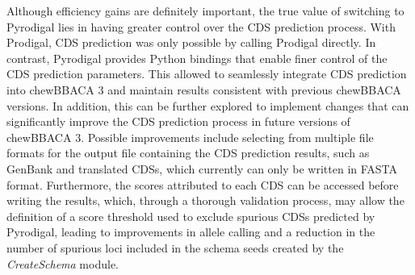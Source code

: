 Although efficiency gains are definitely important, the true value of switching to Pyrodigal lies in having greater control over the \ac{CDS} prediction process. With Prodigal, \ac{CDS} prediction was only possible by calling Prodigal directly. In contrast, Pyrodigal provides Python bindings that enable finer control of the \ac{CDS} prediction parameters. This allowed to seamlessly integrate \ac{CDS} prediction into chewBBACA 3 and maintain results consistent with previous chewBBACA versions. In addition, this can be further explored to implement changes that can significantly improve the \ac{CDS} prediction process in future versions of chewBBACA 3. Possible improvements include selecting from multiple file formats for the output file containing the \ac{CDS} prediction results, such as GenBank and translated \ac{CDSs}, which currently can only be written in FASTA format. Furthermore, the scores attributed to each \ac{CDS} can be accessed before writing the results, which, through a thorough validation process, may allow the definition of a score threshold used to exclude spurious \ac{CDSs} predicted by Pyrodigal, leading to improvements in allele calling and a reduction in the number of spurious loci included in the schema seeds created by the \textit{CreateSchema} module.

